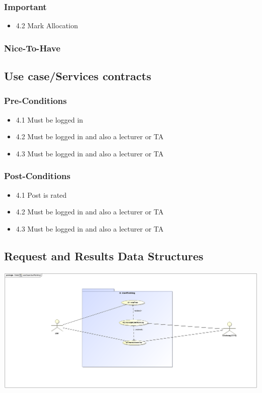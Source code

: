 \documentclass[hidelinks, 12pt, oneside]{article}
\begin{document}
\subsubsection{Important}
\begin{itemize}
  \item 4.2 Mark Allocation
\end{itemize}
\subsubsection{Nice-To-Have}


\subsection{Use case/Services contracts}
\subsubsection{Pre-Conditions}								%
\begin{itemize}
  \item 4.1 Must be logged in
  \item 4.2 Must be logged in and also a lecturer or TA
  \item 4.3 Must be logged in and also a lecturer or TA
\end{itemize}

\subsubsection{Post-Conditions}%
\begin{itemize}
  \item 4.1 Post is rated
  \item 4.2 Must be logged in and also a lecturer or TA
  \item 4.3 Must be logged in and also a lecturer or TA
\end{itemize}

\subsection{Request and Results Data Structures} 
\includegraphics[scale=.9]{Kgomotso/graphics/useCaseUserRanking.eps}\\
\end{document}
